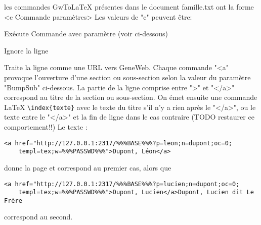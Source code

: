 les commandes GwToLaTeX présentes dans le document famille.txt ont la forme
<c Commande paramètres>
Les valeurs de "c" peuvent être:
\begin{description}[style=nextline]
\item[x] Exécute Commande avec paramètre (voir ci-dessous)
\item[y] Ignore la ligne
\item[a] Traite la ligne comme une URL vers GeneWeb. 
Chaque commande "<a" provoque l'ouverture d'une section ou sous-section selon
la valeur du paramètre "BumpSub" ci-dessous. La partie de la ligne comprise entre
">" et "</a>" correspond au titre de la section ou sous-section.
On émet ensuite une commande LaTeX \verb|\index{texte}| avec le texte du titre s'il
n'y a rien après le "</a>", ou le texte entre le "</a>" et la fin de ligne
dans le cas contraire (TODO restaurer ce comportement!!)
Le texte :
\begin{verbatim}
<a href="http://127.0.0.1:2317/%%%BASE%%%?p=leon;n=dupont;oc=0;
    templ=tex;w=%%%PASSWD%%%">Dupont, Léon</a>
\end{verbatim}
donne la page \pageref{section1} et correspond au premier cas, alors que 
\begin{verbatim}
<a href="http://127.0.0.1:2317/%%%BASE%%%?p=lucien;n=dupont;oc=0;
    templ=tex;w=%%%PASSWD%%%">Dupont, Lucien</a>Dupont, Lucien dit Le Frère
\end{verbatim}
correspond au second.
\end{description}

